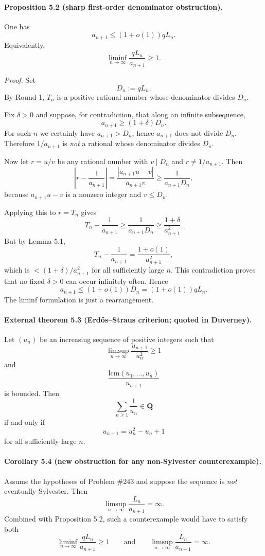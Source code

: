 \paragraph{Proposition 5.2 (sharp first-order denominator obstruction).}
One has
\[
 a_{n+1}\le (1+o(1))qL_n.
\]
Equivalently,
\[
 \liminf_{n\to\infty}\frac{qL_n}{a_{n+1}}\ge 1.
\]

\emph{Proof.}
Set
\[
 D_n:=qL_n.
\]
By Round-1, $T_n$ is a positive rational number whose denominator divides $D_n$.

Fix $\delta>0$ and suppose, for contradiction, that along an infinite subsequence,
\[
 a_{n+1}\ge (1+\delta)D_n.
\]
For such $n$ we certainly have $a_{n+1}>D_n$, hence $a_{n+1}$ does not divide $D_n$. Therefore $1/a_{n+1}$ is \emph{not} a rational whose denominator divides $D_n$.

Now let $r=u/v$ be any rational number with $v\mid D_n$ and $r\ne 1/a_{n+1}$. Then
\[
 \left|r-\frac{1}{a_{n+1}}\right|
 =\frac{|a_{n+1}u-v|}{a_{n+1}v}
 \ge \frac{1}{a_{n+1}D_n},
\]
because $a_{n+1}u-v$ is a nonzero integer and $v\le D_n$.

Applying this to $r=T_n$ gives
\[
 T_n-\frac{1}{a_{n+1}}\ge \frac{1}{a_{n+1}D_n}
 \ge \frac{1+\delta}{a_{n+1}^2}.
\]
But by Lemma 5.1,
\[
 T_n-\frac{1}{a_{n+1}}=\frac{1+o(1)}{a_{n+1}^2},
\]
which is $< (1+\delta)/a_{n+1}^2$ for all sufficiently large $n$. This contradiction proves that no fixed $\delta>0$ can occur infinitely often. Hence
\[
 a_{n+1}\le (1+o(1))D_n=(1+o(1))qL_n.
\]
The liminf formulation is just a rearrangement.

\paragraph{External theorem 5.3 (Erd\H{o}s--Straus criterion; quoted in Duverney).}
Let $(u_n)$ be an increasing sequence of positive integers such that
\[
 \limsup_{n\to\infty}\frac{u_{n+1}}{u_n^2}\ge 1
\]
and
\[
 \frac{\mathrm{lcm}(u_1,\dots,u_n)}{u_{n+1}}
\]
is bounded. Then
\[
 \sum_{n\ge 1}\frac{1}{u_n}\in \mathbf{Q}
\]
if and only if
\[
 u_{n+1}=u_n^2-u_n+1
\]
for all sufficiently large $n$.

\paragraph{Corollary 5.4 (new obstruction for any non-Sylvester counterexample).}
Assume the hypotheses of Problem \#243 and suppose the sequence is \emph{not} eventually Sylvester. Then
\[
 \limsup_{n\to\infty}\frac{L_n}{a_{n+1}}=\infty.
\]
Combined with Proposition 5.2, such a counterexample would have to satisfy both
\[
 \liminf_{n\to\infty}\frac{qL_n}{a_{n+1}}\ge 1
\qquad\mbox{and}\qquad
 \limsup_{n\to\infty}\frac{L_n}{a_{n+1}}=\infty.
\]

